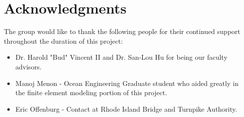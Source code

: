 \section*{Acknowledgments}
The group would like to thank the following people for their continued support throughout the duration of this project:

\begin{itemize}
\item Dr. Harold "Bud" Vincent II and Dr. San-Lou Hu for being our faculty advisors.
\item Manoj Menon - Ocean Engineering Graduate student who aided greatly in the finite element modeling portion of this project.
\item Eric Offenburg - Contact at Rhode Island Bridge and Turnpike Authority.
\end{itemize}